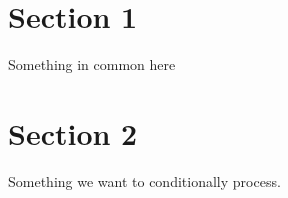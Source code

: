 \documentclass[11pt, letterpaper]{article}
\begin{document}
\section{Section 1}
Something in common here

\section{Section 2}
Something we want to conditionally process.

\iftoggle{long}{
    
}{
    
}
\end{document}
